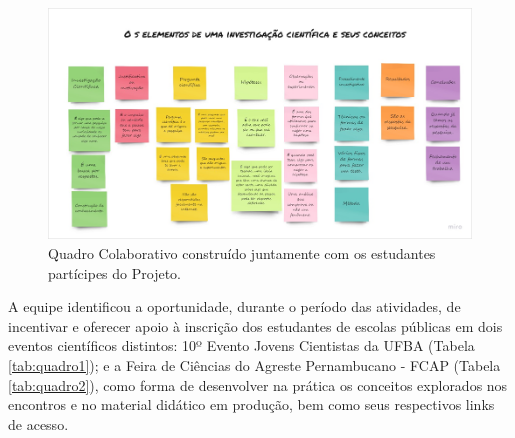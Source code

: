\documentclass[
]{book}
\begin{document}
\begin{figure}
\includegraphics[width=13.46in]{images/image105} \caption{Quadro Colaborativo construído juntamente com os estudantes partícipes do Projeto.}\label{fig:prodcocient}
\end{figure}

A equipe identificou a oportunidade, durante o período das atividades, de incentivar e oferecer apoio à inscrição dos estudantes de escolas públicas em dois eventos científicos distintos: 10º Evento Jovens Cientistas da UFBA (Tabela \ref{tab:quadro1}); e a Feira de Ciências do Agreste Pernambucano - FCAP (Tabela \ref{tab:quadro2}), como forma de desenvolver na prática os conceitos explorados nos encontros e no material didático em produção, bem como seus respectivos links de acesso.
\end{document}
